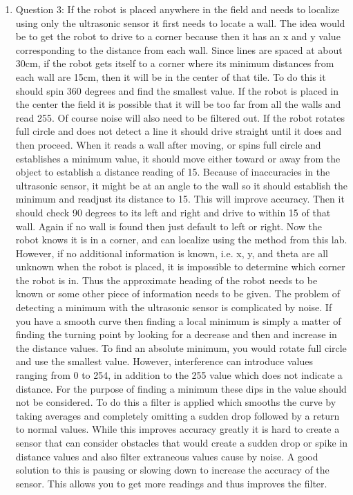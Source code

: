 \documentclass[twocolumn]{article}
\begin{document}
\begin{enumerate}
\item
Question 3:
If the robot is placed anywhere in the field and needs to localize using only the ultrasonic sensor it first needs to locate a wall. The idea would be to get the robot to drive to a corner because then it has an x and y value corresponding to the distance from each wall. Since lines are spaced at about 30cm, if the robot gets itself to a corner where its minimum distances from each wall are 15cm, then it will be in the center of that tile. To do this it should spin 360 degrees and find the smallest value. If the robot is placed in the center the field it is possible that it will be too far from all the walls and read 255. Of course noise will also need to be filtered out. If the robot rotates full circle and does not detect a line it should drive straight until it does and then proceed. When it reads a wall after moving, or spins full circle and establishes a minimum value, it should move either toward or away from the object to establish a distance reading of 15. Because of inaccuracies in the ultrasonic sensor, it might be at an angle to the wall so it should establish the minimum and readjust its distance to 15. This will improve accuracy. Then it should check 90 degrees to its left and right and drive to within 15 of that wall. Again if no wall is found then just default to left or right. Now the robot knows it is in a corner, and can localize using the method from this lab. However, if no additional information is known, i.e. x, y, and theta are all unknown when the robot is placed, it is impossible to determine which corner the robot is in. Thus the approximate heading of the robot needs to be known or some other piece of information needs to be given.
The problem of detecting a minimum with the ultrasonic sensor is complicated by noise. If you have a smooth curve then finding a local minimum is simply a matter of finding the turning point by looking for a decrease and then and increase in the distance values. To find an absolute minimum, you would rotate full circle and use the smallest value. However, interference can introduce values ranging from 0 to 254, in addition to the 255 value which does not indicate a distance. For the purpose of finding a minimum these dips in the value should not be considered. To do this a filter is applied which smooths the curve by taking averages and completely omitting a sudden drop followed by a return to normal values. While this improves accuracy greatly it is hard to create a sensor that can consider obstacles that would create a sudden drop or spike in distance values and also filter extraneous values cause by noise. A good solution to this is pausing or slowing down to increase the accuracy of the sensor. This allows you to get more readings and thus improves the filter.

\end{enumerate}
\end{document}
